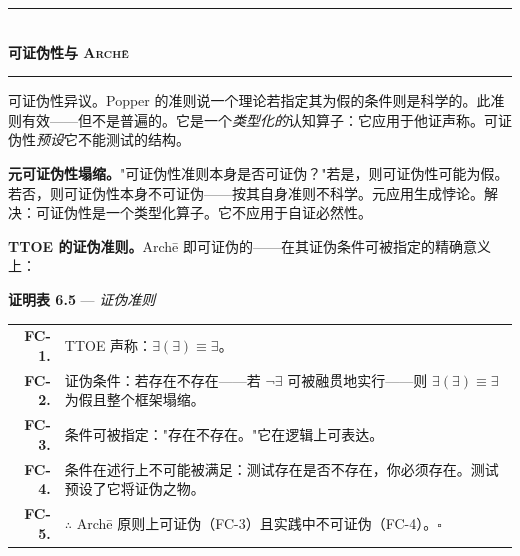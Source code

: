 \documentclass[10pt, openany, oneside]{book}
\renewcommand{\normalsize}{\fontsize{10}{13}\selectfont}
\renewcommand{\footnotesize}{\fontsize{8.5}{11}\selectfont}
\begin{document}
\vspace{1.5em}


\begin{center}
    \rule{0.3\textwidth}{0.4pt}\\[0.5em]
    {\normalsize\bfseries\scshape 可证伪性与 Arch\={e}}\\[0.3em]
    \rule{0.3\textwidth}{0.4pt}
\end{center}

\vspace{1em}

\noindent 可证伪性异议。Popper 的准则说一个理论若指定其为假的条件则是科学的。此准则有效——但不是普遍的。它是一个\textit{类型化的}认知算子：它应用于他证声称。可证伪性\textit{预设}它不能测试的结构。

\textbf{元可证伪性塌缩。}"可证伪性准则本身是否可证伪？"若是，则可证伪性可能为假。若否，则可证伪性本身不可证伪——按其自身准则不科学。元应用生成悖论。解决：可证伪性是一个类型化算子。它不应用于自证必然性。

\textbf{TTOE 的证伪准则。}Arch\={e} 即可证伪的——在其证伪条件可被指定的精确意义上：

\vspace{0.5em}

\textbf{证明表 6.5} --- \textit{证伪准则}

\vspace{0.5em}

{\footnotesize
\noindent\begin{tabular}{r p{}}
\textbf{FC-1.} & TTOE 声称：$\exists(\exists) \equiv \exists$。\\[0.3em]
\textbf{FC-2.} & 证伪条件：若存在不存在——若 $\neg\exists$ 可被融贯地实行——则 $\exists(\exists) \equiv \exists$ 为假且整个框架塌缩。\\[0.3em]
\textbf{FC-3.} & 条件可被指定："存在不存在。"它在逻辑上可表达。\\[0.3em]
\textbf{FC-4.} & 条件在述行上不可能被满足：测试存在是否不存在，你必须存在。测试预设了它将证伪之物。\\[0.3em]
\textbf{FC-5.} & $\therefore$ Arch\={e} 原则上可证伪（FC-3）且实践中不可证伪（FC-4）。$\square$ \\[0.3em]
\end{tabular}
}

\vspace{0.8em}
\end{document}
